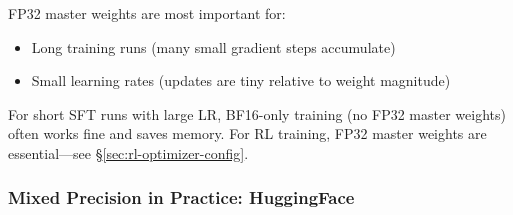 \begin{warningbox}
FP32 master weights are most important for:

\begin{itemize}
  \item Long training runs (many small gradient steps accumulate)
  \item Small learning rates (updates are tiny relative to weight magnitude)
\end{itemize}

For short SFT runs with large LR, BF16-only training (no FP32 master weights) often works fine and saves memory. For RL training, FP32 master weights are essential---see §\ref{sec:rl-optimizer-config}.
\end{warningbox}

\subsubsection{Mixed Precision in Practice: HuggingFace}
\label{mixed-precision-in-practice-huggingface}

